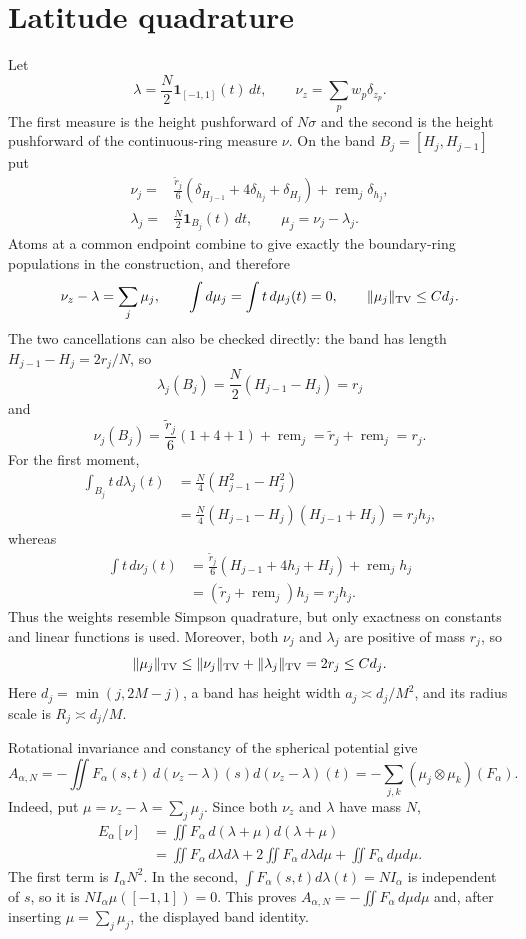 \documentclass[11pt]{amsart}
\begin{document}
\section{Latitude quadrature}

Let
\[
 \lambda=\frac N2\mathbf1_{[-1,1]}(t)\,dt,
 \qquad \nu_z=\sum_pw_p\delta_{z_p}.
\]
The first measure is the height pushforward of $N\sigma$ and the second is
the height pushforward of the continuous-ring measure $\nu$.  On the band
$B_j=[H_j,H_{j-1}]$ put
\begin{align*}
 \nu_j={}&\frac{\widetilde r_j}{6}
 (\delta_{H_{j-1}}+4\delta_{h_j}+\delta_{H_j})
 +\operatorname{rem}_j\delta_{h_j},\\
 \lambda_j={}&\frac N2\mathbf1_{B_j}(t)\,dt,
 \qquad \mu_j=\nu_j-\lambda_j.
\end{align*}
Atoms at a common endpoint combine to give exactly the boundary-ring
populations in the construction, and therefore
\[
 \nu_z-\lambda=\sum_j\mu_j,\qquad
 \int d\mu_j=\int t\,d\mu_j(t)=0,\qquad
 \|\mu_j\|_{\rm TV}\le Cd_j.
\]
The two cancellations can also be checked directly: the band has length
$H_{j-1}-H_j=2r_j/N$, so
\[
 \lambda_j(B_j)=\frac N2(H_{j-1}-H_j)=r_j
\]
and
\[
 \nu_j(B_j)
 =\frac{\widetilde r_j}{6}(1+4+1)
   +\operatorname{rem}_j
 =\widetilde r_j+\operatorname{rem}_j=r_j.
\]
For the first moment,
\begin{align*}
 \int_{B_j}t\,d\lambda_j(t)
 &=\frac N4(H_{j-1}^2-H_j^2)\\
 &=\frac N4(H_{j-1}-H_j)(H_{j-1}+H_j)
 =r_jh_j,
\end{align*}
whereas
\begin{align*}
 \int t\,d\nu_j(t)
 &=\frac{\widetilde r_j}{6}
   (H_{j-1}+4h_j+H_j)
   +\operatorname{rem}_jh_j\\
 &=(\widetilde r_j+\operatorname{rem}_j)h_j=r_jh_j.
\end{align*}
Thus the weights resemble Simpson quadrature, but only exactness on
constants and linear functions is used.  Moreover, both $\nu_j$ and
$\lambda_j$ are positive of mass $r_j$, so
\[
 \|\mu_j\|_{\rm TV}\le
 \|\nu_j\|_{\rm TV}+\|\lambda_j\|_{\rm TV}=2r_j\le Cd_j.
\]
Here $d_j=\min(j,2M-j)$, a band has height width
$a_j\asymp d_j/M^2$, and its radius scale is $R_j\asymp d_j/M$.

Rotational invariance and constancy of the spherical potential give
\[
 A_{\alpha,N}
 =-\iint F_\alpha(s,t)\,d(\nu_z-\lambda)(s)
                         d(\nu_z-\lambda)(t)
 =-\sum_{j,k}(\mu_j\otimes\mu_k)(F_\alpha).          \tag{5.1}
\]
Indeed, put $\mu=\nu_z-\lambda=\sum_j\mu_j$.  Since both $\nu_z$ and
$\lambda$ have mass $N$,
\begin{align*}
 E_\alpha[\nu]
 &=\iint F_\alpha\,d(\lambda+\mu)d(\lambda+\mu)\\
 &=\iint F_\alpha\,d\lambda d\lambda
   +2\iint F_\alpha\,d\lambda d\mu
   +\iint F_\alpha\,d\mu d\mu.
\end{align*}
The first term is $I_\alpha N^2$.  In the second,
$\int F_\alpha(s,t)d\lambda(t)=NI_\alpha$ is independent of $s$, so it is
$NI_\alpha\mu([-1,1])=0$.  This proves
$A_{\alpha,N}=-\iint F_\alpha\,d\mu d\mu$ and, after inserting
$\mu=\sum_j\mu_j$, the displayed band identity.
\end{document}

